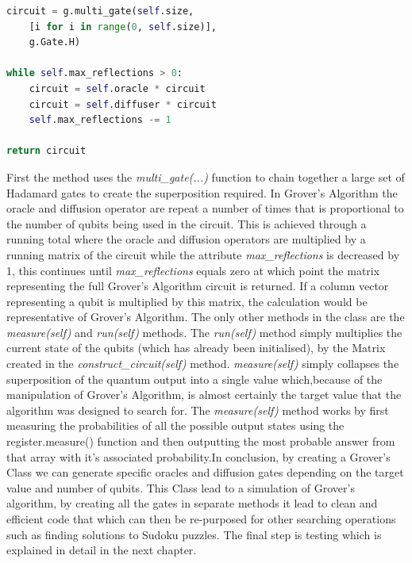 \documentclass{article}
\begin{document}
\begin{file}
\begin{lstlisting}[language=Python]
circuit = g.multi_gate(self.size, 
	[i for i in range(0, self.size)],
	g.Gate.H)

while self.max_reflections > 0:
	circuit = self.oracle * circuit
	circuit = self.diffuser * circuit
	self.max_reflections -= 1
	
return circuit

\end{lstlisting}
\end{file}

First the method uses the \textit{multi\_gate(...)} function to chain together a large set of Hadamard gates to create the superposition required. In Grover's Algorithm the oracle and diffusion operator are repeat a number of times that is proportional to the number of qubits being used in the circuit. This is achieved through a running total where the oracle and diffusion operators are multiplied by a running matrix of the circuit while the attribute \textit{max\_reflections} is decreased by 1, this continues until  \textit{max\_reflections} equals zero at which point the matrix representing the full Grover's Algorithm circuit is returned. If a column vector representing a qubit is multiplied by this matrix, the calculation would be representative of Grover's Algorithm. The only other methods in the class are the \textit{measure(self)} and \textit{run(self)} methods. The \textit{run(self)} method simply multiplies the current state of the qubits (which has already been initialised), by the Matrix created in the \textit{construct\_circuit(self)} method. \textit{measure(self)} simply collapses the superposition of the quantum output into a single value which,because of the manipulation of Grover's Algorithm, is almost certainly the target value that the algorithm was designed to search for. The \textit{measure(self)} method works by first measuring the probabilities of all the possible output states using the register.measure() function and then outputting the most probable answer from that array with it's associated probability.In conclusion, by creating a Grover's Class we can generate specific oracles and diffusion gates depending on the target value and number of qubits. This Class lead to a simulation of Grover's algorithm, by creating all the gates in separate methods it lead to clean and efficient code that which can then be re-purposed for other searching operations such as finding solutions to Sudoku puzzles. The final step is testing which is explained in detail in the next chapter.
\end{document}

